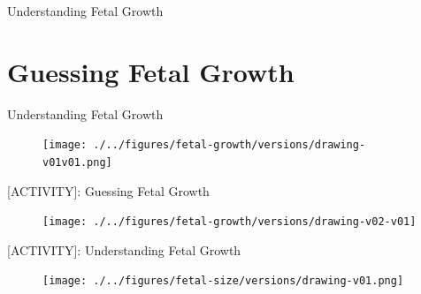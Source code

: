 

{
\begin{frame}{}

\BigSizeFont
Understanding Fetal Growth
\end{frame}
}




\section{Guessing Fetal Growth}



{
\begin{frame}{Understanding Fetal Growth}
      \begin{figure}
        \centering
        \texttt{[image: ./../figures/fetal-growth/versions/drawing-v01v01.png]}
      \end{figure}
\end{frame}
}





{
\begin{frame}{[\faUsers ACTIVITY]: Guessing Fetal Growth}
      \begin{figure}
        \centering
        \texttt{[image: ./../figures/fetal-growth/versions/drawing-v02-v01]}
      \end{figure}
\end{frame}
}



{
\begin{frame}{[\faUsers ACTIVITY]: Understanding Fetal Growth}
      \begin{figure}
        \centering
        \texttt{[image: ./../figures/fetal-size/versions/drawing-v01.png]}
      \end{figure}
\end{frame}
}


